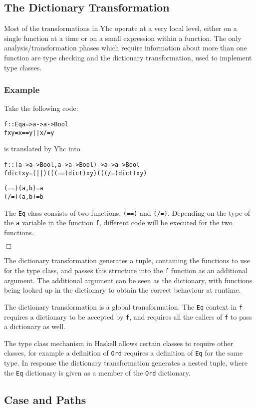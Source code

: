 \documentclass[preprint]{sigplanconf}
\newcommand{\T}[1]{\texttt{#1}}
\newcounter{exmp}
\newcommand{\yesexample}{\subsubsection*{Example \arabic{exmp}}\addtocounter{exmp}{1}}
\newcommand{\noexample}{\hfill$\Box$}
\newenvironment{code}{\begin{alltt}\small}{\end{alltt}}
\begin{document}
\subsection{The Dictionary Transformation}

Most of the transformations in Yhc operate at a very local level, either on a
single function at a time or on a small expression within a function. The only
analysis/transformation phases which require information about more than one
function are type checking and the dictionary transformation, used to implement
type classes.

\yesexample

Take the following code:

\begin{code}
 f :: Eq a => a -> a -> Bool
 f x y = x == y || x /= y
\end{code}

is translated by Yhc into

\begin{code}
 f :: (a -> a -> Bool, a -> a -> Bool) -> a -> a -> Bool
 f dict x y = (||) (((==) dict) x y) (((/=) dict) x y)

 (==) (a,b) = a
 (/=) (a,b) = b
\end{code}

The \T{Eq} class consists of two functions, \T{(==)} and \T{(/=)}. Depending on
the type of the \T{a} variable in the function \T{f}, different code will be
executed for the two functions.

\noexample

The dictionary transformation generates a tuple, containing the functions to
use for the type class, and passes this structure into the \T{f} function as an
additional argument. The additional argument can be seen as the dictionary,
with functions being looked up in the dictionary to obtain the correct
behaviour at runtime.

The dictionary transformation is a global transformation. The \T{Eq} context in
\T{f} requires a dictionary to be accepted by \T{f}, and requires all the
callers of \T{f} to pass a dictionary as well.

The type class mechanism in Haskell allows certain classes to require other
classes, for example a definition of \T{Ord} requires a definition of \T{Eq}
for the same type. In response the dictionary transformation generates a nested
tuple, where the \T{Eq} dictionary is given as a member of the \T{Ord}
dictionary.

\subsection{Case and Paths}
\end{document}
